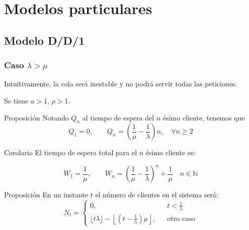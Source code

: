 \documentclass[8pt]{beamer}
\begin{document}
  
  
\section{Modelos particulares}

  \subsection{Modelo D/D/1}
  \begin{frame}\frametitle{Caso $\lambda > \mu$}
    Intuitivamente, la cola será inestable y no podrá servir todas las peticiones. 

    Se tiene $a > 1$, $\rho > 1$.

    \begin{block}{Proposición}
      Notando $Q_n$ al tiempo de espera del $n$ ésimo cliente, tenemos que \[Q_1 = 0, \qquad Q_n = \left(\frac{1}{\mu} - \frac{1}{\lambda}\right)n, \quad \forall n\ge 2\]
    \end{block}

    \begin{block}{Corolario}
      El tiempo de espera total para el $n$ ésimo cliente es:
 
      \[W_1 = \frac{1}{\mu}, \qquad W_n = \left(\frac{1}{\mu} - \frac{1}{\lambda}\right)^n + \frac{1}{\mu} \quad n\in \mathbb{N}\]
    \end{block}

    \begin{block}{Proposición}
      En un instante $t$ el número de clientes en el sistema será: 
      \[N_t = \left\{\begin{array}{lcc}
      0, && t < \frac{1}{\lambda}\\
      \lfloor t\lambda \rfloor - \left\lfloor\left(t-\frac{1}{\lambda}\right)\mu\right\rfloor, && \text{otro caso}
      \end{array}\right.\]
    \end{block}

  \end{frame}
\end{document}
